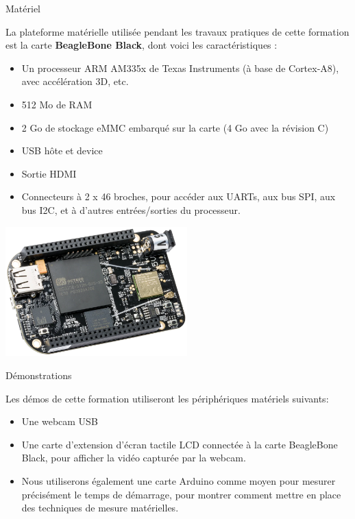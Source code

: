\documentclass[a4paper,12pt,obeyspaces,spaces,hyphens]{article}
\begin{document}
\feshowtitle

\feshowinfo

\feagendatwocolumn
{Matériel}
{
  La plateforme matérielle utilisée pendant les travaux pratiques de
  cette formation est la carte {\bf BeagleBone Black}, dont voici les
  caractéristiques :

  \begin{itemize}
  \item Un processeur ARM AM335x de Texas Instruments (à base de
    Cortex-A8), avec accélération 3D, etc.
  \item 512 Mo de RAM
  \item 2 Go de stockage eMMC embarqué sur la carte
	\newline(4 Go avec la révision C)
  \item USB hôte et device
  \item Sortie HDMI
  \item Connecteurs à 2 x 46 broches, pour accéder aux UARTs, aux
        bus SPI, aux bus I2C, et à d'autres entrées/sorties du
        processeur.
  \end{itemize}
}
{}
{
  \begin{center}
    \includegraphics[height=5cm]{../slides/beagleboneblack-board/beagleboneblack.png}
  \end{center}
}

\feagendaonecolumn
{Démonstrations}
{
  Les démos de cette formation utiliseront les périphériques matériels suivants:

  \begin{itemize}
  \item Une webcam USB
  \item Une carte d'extension d'écran tactile LCD connectée à la carte
    BeagleBone Black, pour afficher la vidéo capturée par la webcam.
  \item Nous utiliserons également une carte Arduino comme moyen pour mesurer
    précisément le temps de démarrage, pour montrer comment mettre en place
    des techniques de mesure matérielles.
  \end{itemize}
}
\end{document}
